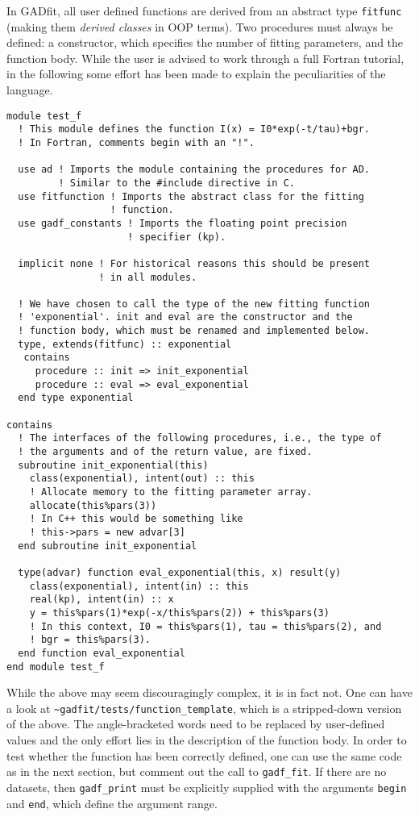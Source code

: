 \documentclass{article}
\begin{document}
In GADfit, all user defined functions are derived from an abstract type \texttt{fitfunc} (making them \textit{derived classes} in OOP terms). Two procedures must always be defined: a constructor, which specifies the number of fitting parameters, and the function body. While the user is advised to work through a full Fortran tutorial, in the following some effort has been made to explain the peculiarities of the language.
\begin{verbatim}
module test_f
  ! This module defines the function I(x) = I0*exp(-t/tau)+bgr.
  ! In Fortran, comments begin with an "!".

  use ad ! Imports the module containing the procedures for AD. 
         ! Similar to the #include directive in C.
  use fitfunction ! Imports the abstract class for the fitting
                  ! function. 
  use gadf_constants ! Imports the floating point precision
                     ! specifier (kp).

  implicit none ! For historical reasons this should be present
                ! in all modules.

  ! We have chosen to call the type of the new fitting function
  ! 'exponential'. init and eval are the constructor and the
  ! function body, which must be renamed and implemented below.
  type, extends(fitfunc) :: exponential
   contains
     procedure :: init => init_exponential
     procedure :: eval => eval_exponential
  end type exponential

contains
  ! The interfaces of the following procedures, i.e., the type of
  ! the arguments and of the return value, are fixed.
  subroutine init_exponential(this)
    class(exponential), intent(out) :: this
    ! Allocate memory to the fitting parameter array.
    allocate(this%pars(3))
    ! In C++ this would be something like
    ! this->pars = new advar[3]
  end subroutine init_exponential

  type(advar) function eval_exponential(this, x) result(y)
    class(exponential), intent(in) :: this
    real(kp), intent(in) :: x
    y = this%pars(1)*exp(-x/this%pars(2)) + this%pars(3)
    ! In this context, I0 = this%pars(1), tau = this%pars(2), and
    ! bgr = this%pars(3).
  end function eval_exponential
end module test_f
\end{verbatim}
While the above may seem discouragingly complex, it is in fact not. One can have a look at \verb+~gadfit/tests/function_template+, which is a stripped-down version of the above. The angle-bracketed words need to be replaced by user-defined values and the only effort lies in the description of the function body. In order to test whether the function has been correctly defined, one can use the same code as in the next section, but comment out the call to \verb+gadf_fit+. If there are no datasets, then \verb+gadf_print+ must be explicitly supplied with the arguments \verb+begin+ and \verb+end+, which define the argument range.
\end{document}
